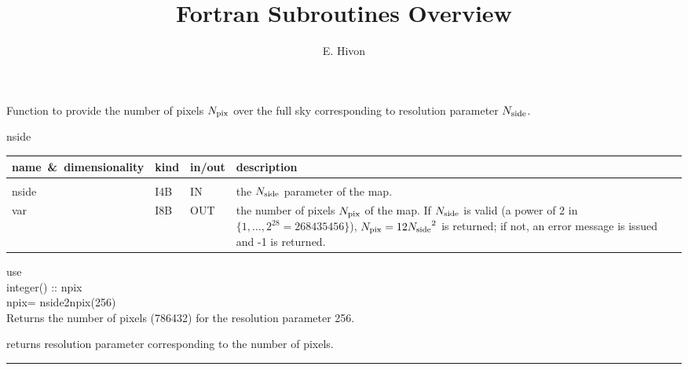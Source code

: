 
\sloppy


\title{\healpix Fortran Subroutines Overview}
 \section[nside2npix]{ }
\label{sub:nside2npix}
\author{E. Hivon}

\begin{facility}
{Function to provide the number of pixels ${N_{\rm pix}}$ over the full sky corresponding
to resolution parameter ${N_{\rm side}}$. 
}
{\modPixTools}
\end{facility}

\begin{f90function}
{nside}
\end{f90function}

\begin{arguments}
{
\begin{tabular}{p{0.3\hsize} p{0.05\hsize} p{0.1\hsize} p{0.45\hsize}} \hline  
\textbf{name~\&~dimensionality} & \textbf{kind} & \textbf{in/out} & \textbf{description} \\ \hline
                   &   &   &                           \\ %
nside & I4B & IN & the ${N_{\rm side}}$ parameter of the map. \\
var & I8B & OUT & the number of pixels ${N_{\rm pix}}$ of the map. If ${N_{\rm side}}$ is valid (a power of 2 in
$\{1,\ldots,2^{28}=268435456\}$), ${N_{\rm pix}}=12{N_{\rm side}}^2$ is returned; if not, an error message is
issued and -1 is returned.\\
\end{tabular}
}
\end{arguments}

\begin{example}
{
use  \\
integer() :: npix \\
npix= nside2npix(256)  \\
}
{
Returns the number of \healpix pixels (786432) for the resolution
parameter 256.
}
\end{example}
\begin{related}
  \begin{sulist}{} %
  \item[\htmlref{npix2nside}{sub:npix2nside}] returns resolution parameter corresponding to the number of pixels.
  \end{sulist}
\end{related}

\rule{\hsize}{2mm}


